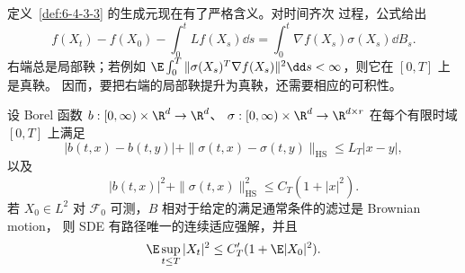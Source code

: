 定义~\ref{def:6-4-3-3} 的生成元现在有了严格含义。对时间齐次 \Ito{} 过程，公式给出
\[
 f(X_t)-f(X_0)-\int_0^tLf(X_s)\dd s
 =\int_0^t\nabla f(X_s)\sigma(X_s)\dd B_s.
\]
右端总是局部鞅；若例如
$\E\int_0^T\|\sigma(X_s)^T\nabla f(X_s)\|^2\dd s<\infty$，则它在 $[0,T]$ 上是真鞅。
因而，要把右端的局部鞅提升为真鞅，还需要相应的可积性。

\begin{theorem}\label{theorem:6-4-3-2}
设 Borel 函数
$b:[0,\infty)\times\R^d\to\R^d$、
$\sigma:[0,\infty)\times\R^d\to\R^{d\times r}$ 在每个有限时域 $[0,T]$ 上满足
\[
 |b(t,x)-b(t,y)|+\|\sigma(t,x)-\sigma(t,y)\|_{\mathrm{HS}}
 \le L_T|x-y|,
\]
以及
\[
 |b(t,x)|^2+\|\sigma(t,x)\|_{\mathrm{HS}}^2
 \le C_T(1+|x|^2).
\]
若 $X_0\in L^2$ 对 $\mathcal F_0$ 可测，$B$ 相对于给定的满足通常条件的滤过是 Brownian motion，
则 SDE 有路径唯一的连续适应强解，并且
\[
 \E\sup_{t\le T}|X_t|^2
 \le C_T'(1+\E|X_0|^2).
\]
\end{theorem}


